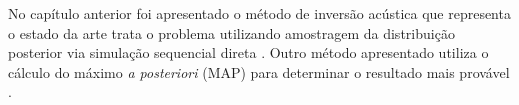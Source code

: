 No capítulo anterior foi apresentado o método de inversão acústica que
representa o estado da arte trata o problema utilizando amostragem da distribuição posterior via
simulação sequencial direta \citep{amilcarInversao}. Outro método apresentado
utiliza o cálculo do máximo \textit{a posteriori} (MAP) para determinar o
resultado mais provável \citep{Buland01012003}.
% 
% 
% 
% 
% 
